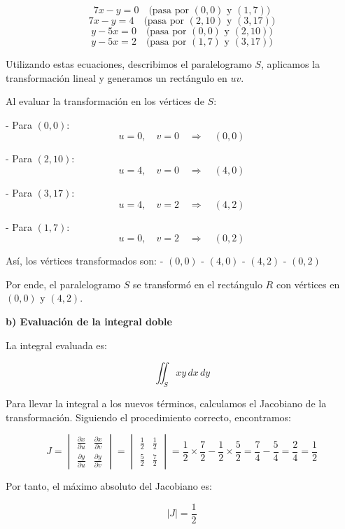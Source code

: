 \documentclass{report}
\begin{document}
\[
7x - y = 0 \quad \text{(pasa por \((0,0)\) y \((1,7)\))}
\]
\[
7x - y = 4 \quad \text{(pasa por \((2,10)\) y \((3,17)\))}
\]
\[
y - 5x = 0 \quad \text{(pasa por \((0,0)\) y \((2,10)\))}
\]
\[
y - 5x = 2 \quad \text{(pasa por \((1,7)\) y \((3,17)\))}
\]

Utilizando estas ecuaciones, describimos el paralelogramo \(S\), aplicamos la transformación lineal y generamos un rectángulo en \(uv\).

Al evaluar la transformación en los vértices de \(S\):

- Para \((0, 0)\):
  \[
  u = 0, \quad v = 0 \quad \Rightarrow \quad (0, 0)
  \]

- Para \((2, 10)\):
  \[
  u = 4, \quad v = 0 \quad \Rightarrow \quad (4, 0)
  \]

- Para \((3, 17)\):
  \[
  u = 4, \quad v = 2 \quad \Rightarrow \quad (4, 2)
  \]

- Para \((1, 7)\):
  \[
  u = 0, \quad v = 2 \quad \Rightarrow \quad (0, 2)
  \]

Así, los vértices transformados son:
- \((0, 0)\)
- \((4, 0)\)
- \((4, 2)\)
- \((0, 2)\)

Por ende, el paralelogramo \(S\) se transformó en el rectángulo \(R\) con vértices en \((0, 0)\) y \((4, 2)\).

\vspace{10pt}
\textbf{b) Evaluación de la integral doble}

La integral evaluada es:

\[
\iint_{S} xy \, dx \, dy
\]

Para llevar la integral a los nuevos términos, calculamos el Jacobiano de la transformación. Siguiendo el procedimiento correcto, encontramos:

\[
J = 
\begin{vmatrix}
\frac{\partial x}{\partial u} & \frac{\partial x}{\partial v} \\
\frac{\partial y}{\partial u} & \frac{\partial y}{\partial v}
\end{vmatrix} =
\begin{vmatrix}
\frac{1}{2} & \frac{1}{2} \\
\frac{5}{2} & \frac{7}{2}
\end{vmatrix}
= \frac{1}{2} \times \frac{7}{2} - \frac{1}{2} \times \frac{5}{2} = \frac{7}{4} - \frac{5}{4} = \frac{2}{4} = \frac{1}{2}
\]

Por tanto, el máximo absoluto del Jacobiano es:

\[
|J| = \frac{1}{2}
\]
\end{document}
